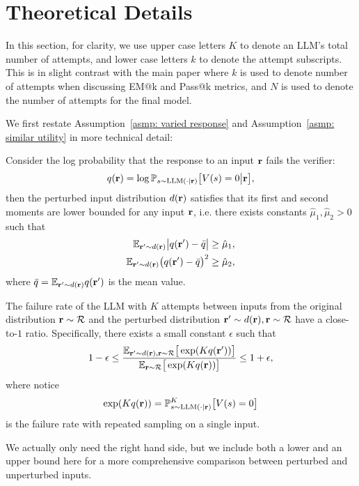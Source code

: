 \section{Theoretical Details}\label{sec:theoreticadetail}

In this section, for clarity, we use upper case letters $K$ to denote an LLM's total number of attempts, and lower case letters $k$ to denote the attempt subscripts. This is in slight contrast with the main paper where $k$ is used to denote number of attempts when discussing EM@k and Pass@k metrics, and $N$ is used to denote the number of attempts for the final model. 

We first restate Assumption~\ref{asmp: varied response} and Assumption~\ref{asmp: similar utility} in more technical detail: 
\begin{assumption} 
Consider the log probability that the response to an input $\mathbf{r}$ fails the verifier: 
$$ q(\mathbf{r}) = \log \mathbb{P}_{s \sim \text{LLM} (\cdot|\mathbf{r})} \big[V(s) = 0 \big| \mathbf{r} \big], $$
then the perturbed input distribution $d(\mathbf{r})$ satisfies that its first and second moments are lower bounded for any input $\mathbf{r}$, i.e. there exists constants $\hat{\mu}_1, \hat{\mu}_2 > 0$ such that
\begin{equation}
\begin{aligned}
    \mathbb{E}_{\mathbf{r}' \sim d(\mathbf{r})} \big|q(\mathbf{r}') - \bar{q} \big| &\geq \hat{\mu}_1, \\
    \mathbb{E}_{\mathbf{r}' \sim d(\mathbf{r})} \big( q(\mathbf{r}') - \bar{q} \big)^2 &\geq \hat{\mu}_2, 
\end{aligned}
\end{equation}
where $\bar{q} = \mathbb{E}_{\mathbf{r}' \sim d(\mathbf{r})} q(\mathbf{r}')$ is the mean value. 
\end{assumption}

\begin{assumption} 
The failure rate of the LLM with $K$ attempts between inputs from the original distribution $\mathbf{r} \sim \mathcal{R}$ and the perturbed distribution $\mathbf{r}' \sim d(\mathbf{r}), \mathbf{r} \sim \mathcal{R}$ have a close-to-$1$ ratio. Specifically, there exists a small constant $\epsilon$ such that
$$ 1-\epsilon \leq \frac{\mathbb{E}_{\mathbf{r}' \sim d(\mathbf{r}), \mathbf{r} \sim \mathcal{R}} \big[ \exp(K q(\mathbf{r}')) \big]} {\mathbb{E}_{\mathbf{r} \sim \mathcal{R}} \big[ \exp(K q(\mathbf{r})) \big]} \leq 1+\epsilon, $$
where notice
$$ \exp(K q(\mathbf{r})) = \mathbb{P}_{s \sim \text{LLM} (\cdot|\mathbf{r})} ^K \big[V(s) = 0 \big] $$
is the failure rate with repeated sampling on a single input. 
\end{assumption}
\begin{remark}
We actually only need the right hand side, but we include both a lower and an upper bound here for a more comprehensive comparison between perturbed and unperturbed inputs. 
\end{remark}

